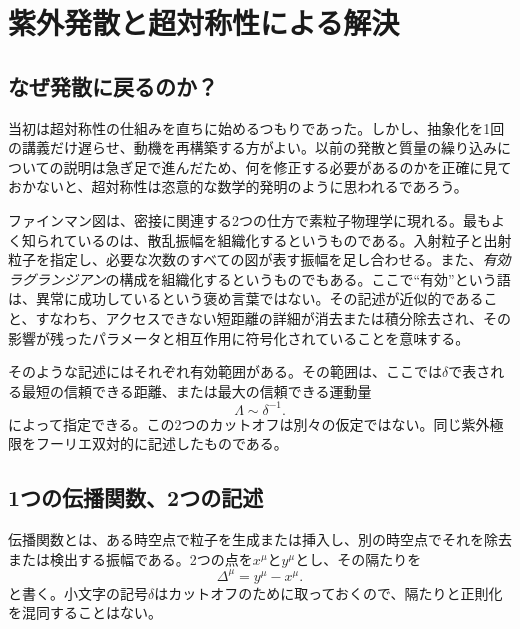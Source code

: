 \chapter{紫外発散と超対称性による解決}


\section{なぜ発散に戻るのか？}

当初は超対称性の仕組みを直ちに始めるつもりであった。しかし、抽象化を1回の講義だけ遅らせ、動機を再構築する方がよい。以前の発散と質量の繰り込みについての説明は急ぎ足で進んだため、何を修正する必要があるのかを正確に見ておかないと、超対称性は恣意的な数学的発明のように思われるであろう。

ファインマン図は、密接に関連する2つの仕方で素粒子物理学に現れる。最もよく知られているのは、散乱振幅を組織化するというものである。入射粒子と出射粒子を指定し、必要な次数のすべての図が表す振幅を足し合わせる。また、\emph{有効ラグランジアン}の構成を組織化するというものでもある。ここで``有効''という語は、異常に成功しているという褒め言葉ではない。その記述が近似的であること、すなわち、アクセスできない短距離の詳細が消去または積分除去され、その影響が残ったパラメータと相互作用に符号化されていることを意味する。

そのような記述にはそれぞれ有効範囲がある。その範囲は、ここでは\(\delta\)で表される最短の信頼できる距離、または最大の信頼できる運動量
\begin{equation}
\Lambda\sim \delta^{-1}.
\end{equation}
によって指定できる。この2つのカットオフは別々の仮定ではない。同じ紫外極限をフーリエ双対的に記述したものである。

\section{1つの伝播関数、2つの記述}

伝播関数とは、ある時空点で粒子を生成または挿入し、別の時空点でそれを除去または検出する振幅である。2つの点を\(x^\mu\)と\(y^\mu\)とし、その隔たりを
\begin{equation}
\Delta^\mu=y^\mu-x^\mu.
\end{equation}
と書く。小文字の記号\(\delta\)はカットオフのために取っておくので、隔たりと正則化を混同することはない。

